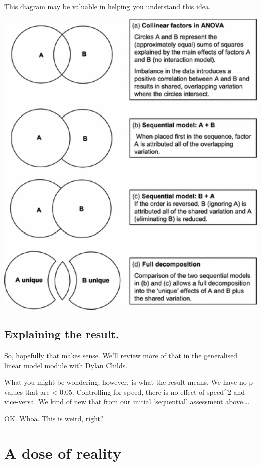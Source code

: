 \documentclass[
]{book}
\begin{document}
This diagram may be valuable in helping you understand this idea.

\includegraphics[width=10.22in]{images/VennModels}

\hypertarget{explaining-the-result.}{%
\subsection{Explaining the result.}\label{explaining-the-result.}}

So, hopefully that makes sense. We'll review more of that in the generalised linear model module with Dylan Childs.

What you might be wondering, however, is what the result means. We have no p-values that are \textless{} 0.05. Controlling for speed, there is no effect of speed\^{}2 and vice-versa. We kind of new that from our initial `sequential' assessment above\ldots.

OK. Whoa. This is weird, right?

\hypertarget{a-dose-of-reality}{%
\section{A dose of reality}\label{a-dose-of-reality}}
\end{document}
